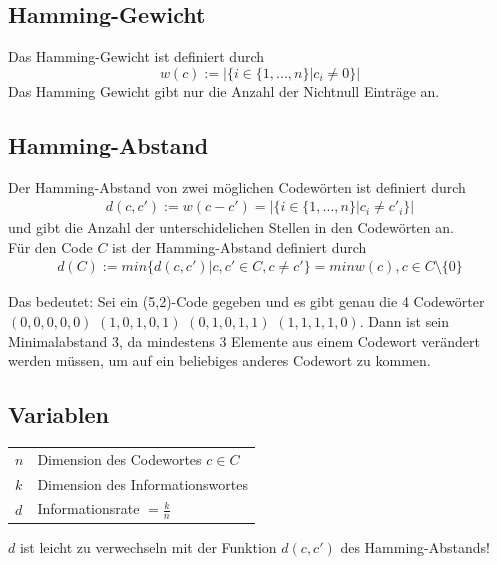 \documentclass{scrartcl}
\begin{document}
\subsection{Hamming-Gewicht}

\begin{Def}
Das Hamming-Gewicht ist definiert durch
\[
w(c) := \Big| \Big\{ i \in \{ 1,...,n \} \Big| c_i \neq 0 \Big\} \Big|
\]
Das Hamming Gewicht gibt nur die Anzahl der Nichtnull Einträge an.
\end{Def}

\subsection{Hamming-Abstand}
\begin{Def}
Der Hamming-Abstand von zwei möglichen Codewörten ist definiert durch
\begin{align*}
d(c,c') := w(c - c') = \Big| \Big\{ i \in \{ 1, ..., n \} \Big| c_i \neq c'_i \Big\}\Big|
\end{align*}
und gibt die Anzahl der unterschidelichen Stellen in den Codewörten an.\\
Für den Code $C$ ist der Hamming-Abstand definiert durch
\begin{align*}
d(C) := min\Big\{ d(c, c') \Big| c, c' \in C, c \neq c' \Big\} = min w(c), c \in C \setminus \{0\}
\end{align*}
\end{Def}

\begin{Beispiel}
Das bedeutet: Sei ein (5,2)-Code gegeben und es gibt genau die 4 Codewörter $(0,0,0,0,0) $ $ (1,0,1,0,1) $ $ (0,1,0,1,1) $ $(1,1,1,1,0)$. Dann ist sein Minimalabstand 3, da mindestens 3 Elemente aus einem Codewort verändert werden müssen, um auf ein beliebiges anderes Codewort zu kommen.
\end{Beispiel}

\subsection{Variablen}
\begin{tabular}{ll}
$n$ & Dimension des Codewortes $c \in C$ \\
$k$ & Dimension des Informationswortes \\
$d$ & Informationsrate $ = \frac{k}{n}$
\end{tabular}

\begin{Warnung}
$d$ ist leicht zu verwechseln mit der Funktion $d(c, c') $ des Hamming-Abstands!
\end{Warnung}
\end{document}
